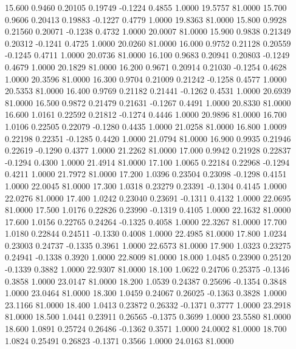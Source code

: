   15.600   0.9460   0.20105   0.19749  -0.1224   0.4855   1.0000  19.5757  81.0000
  15.700   0.9606   0.20413   0.19883  -0.1227   0.4779   1.0000  19.8363  81.0000
  15.800   0.9928   0.21560   0.20071  -0.1238   0.4732   1.0000  20.0007  81.0000
  15.900   0.9838   0.21349   0.20312  -0.1241   0.4725   1.0000  20.0260  81.0000
  16.000   0.9752   0.21128   0.20559  -0.1245   0.4711   1.0000  20.0736  81.0000
  16.100   0.9683   0.20941   0.20803  -0.1249   0.4679   1.0000  20.1829  81.0000
  16.200   0.9671   0.20914   0.21030  -0.1254   0.4628   1.0000  20.3596  81.0000
  16.300   0.9704   0.21009   0.21242  -0.1258   0.4577   1.0000  20.5353  81.0000
  16.400   0.9769   0.21182   0.21441  -0.1262   0.4531   1.0000  20.6939  81.0000
  16.500   0.9872   0.21479   0.21631  -0.1267   0.4491   1.0000  20.8330  81.0000
  16.600   1.0161   0.22592   0.21812  -0.1274   0.4446   1.0000  20.9896  81.0000
  16.700   1.0106   0.22505   0.22079  -0.1280   0.4435   1.0000  21.0258  81.0000
  16.800   1.0009   0.22198   0.22351  -0.1285   0.4420   1.0000  21.0794  81.0000
  16.900   0.9935   0.21946   0.22619  -0.1290   0.4377   1.0000  21.2262  81.0000
  17.000   0.9942   0.21928   0.22837  -0.1294   0.4300   1.0000  21.4914  81.0000
  17.100   1.0065   0.22184   0.22968  -0.1294   0.4211   1.0000  21.7972  81.0000
  17.200   1.0396   0.23504   0.23098  -0.1298   0.4151   1.0000  22.0045  81.0000
  17.300   1.0318   0.23279   0.23391  -0.1304   0.4145   1.0000  22.0276  81.0000
  17.400   1.0242   0.23040   0.23691  -0.1311   0.4132   1.0000  22.0695  81.0000
  17.500   1.0176   0.22826   0.23990  -0.1319   0.4105   1.0000  22.1632  81.0000
  17.600   1.0156   0.22765   0.24264  -0.1325   0.4058   1.0000  22.3267  81.0000
  17.700   1.0180   0.22844   0.24511  -0.1330   0.4008   1.0000  22.4985  81.0000
  17.800   1.0234   0.23003   0.24737  -0.1335   0.3961   1.0000  22.6573  81.0000
  17.900   1.0323   0.23275   0.24941  -0.1338   0.3920   1.0000  22.8009  81.0000
  18.000   1.0485   0.23900   0.25120  -0.1339   0.3882   1.0000  22.9307  81.0000
  18.100   1.0622   0.24706   0.25375  -0.1346   0.3858   1.0000  23.0147  81.0000
  18.200   1.0539   0.24387   0.25696  -0.1354   0.3848   1.0000  23.0464  81.0000
  18.300   1.0459   0.24067   0.26025  -0.1363   0.3828   1.0000  23.1166  81.0000
  18.400   1.0413   0.23872   0.26332  -0.1371   0.3777   1.0000  23.2918  81.0000
  18.500   1.0441   0.23911   0.26565  -0.1375   0.3699   1.0000  23.5580  81.0000
  18.600   1.0891   0.25724   0.26486  -0.1362   0.3571   1.0000  24.0002  81.0000
  18.700   1.0824   0.25491   0.26823  -0.1371   0.3566   1.0000  24.0163  81.0000
